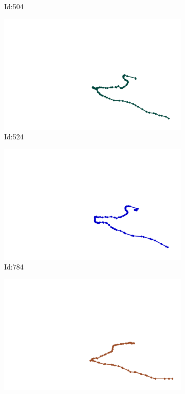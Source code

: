 \documentclass[12pt,twoside]{report}
\begin{document}
\begin{figure}
\begin{subfigure}[b]{0.20\textwidth}
\caption{Id:504}
\end{subfigure}
\begin{subfigure}[b]{0.20\textwidth}
\centering
\includegraphics[width=\textwidth]{../../trajectories/524.png}
\caption{Id:524}
\end{subfigure}
\begin{subfigure}[b]{0.20\textwidth}
\centering
\includegraphics[width=\textwidth]{../../trajectories/784.png}
\caption{Id:784}
\end{subfigure}
\begin{subfigure}[b]{0.20\textwidth}
\centering
\includegraphics[width=\textwidth]{../../trajectories/810.png}

\end{subfigure}
\end{figure}
\end{document}
